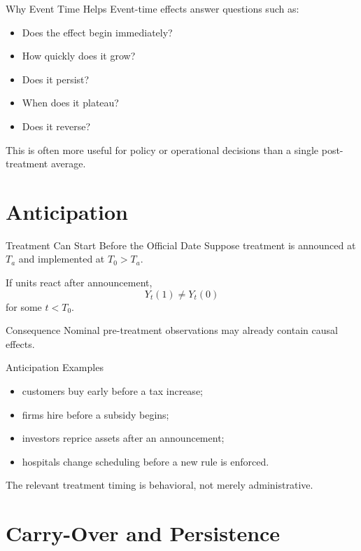\documentclass[aspectratio=169,11pt]{beamer}
\begin{document}
\begin{frame}{Why Event Time Helps}
Event-time effects answer questions such as:
\begin{itemize}
\item Does the effect begin immediately?
\item How quickly does it grow?
\item Does it persist?
\item When does it plateau?
\item Does it reverse?
\end{itemize}

This is often more useful for policy or operational decisions than a single post-treatment average.
\end{frame}

\section{Anticipation}

\begin{frame}{Treatment Can Start Before the Official Date}
Suppose treatment is announced at \(T_a\) and implemented at \(T_0>T_a\).

If units react after announcement,
\[
Y_t(1)\neq Y_t(0)
\]
for some \(t<T_0\).

\begin{alertblock}{Consequence}
Nominal pre-treatment observations may already contain causal effects.
\end{alertblock}
\end{frame}

\begin{frame}{Anticipation Examples}
\begin{itemize}
\item customers buy early before a tax increase;
\item firms hire before a subsidy begins;
\item investors reprice assets after an announcement;
\item hospitals change scheduling before a new rule is enforced.
\end{itemize}

The relevant treatment timing is behavioral, not merely administrative.
\end{frame}

\section{Carry-Over and Persistence}
\end{document}
